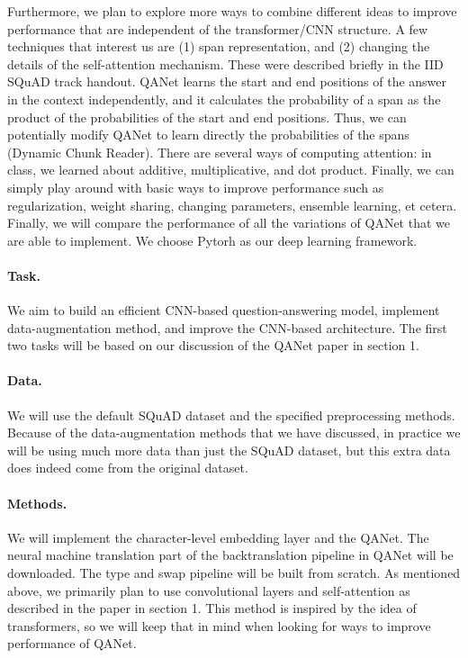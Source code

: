 \documentclass{article}
\begin{document}
Furthermore, we plan to explore more ways to combine different ideas to improve performance that are independent of the transformer/CNN structure. A few techniques that interest us are (1) span representation, and (2) changing the details of the self-attention mechanism. These were described briefly in the IID SQuAD track handout. QANet learns the start and end positions of the answer in the context independently, and it calculates the probability of a span as the product of the probabilities of the start and end positions. Thus, we can potentially modify QANet to learn directly the probabilities of the spans (Dynamic Chunk Reader). There are several ways of computing attention: in class, we learned about additive, multiplicative, and dot product. Finally, we can simply play around with basic ways to improve performance such as regularization, weight sharing, changing parameters, ensemble learning, et cetera. Finally, we will compare the performance of all the variations of QANet that we are able to implement. We choose Pytorh as our deep learning framework. 
\paragraph{Task.} 
We aim to build an efficient CNN-based question-answering model, implement data-augmentation method, and improve the CNN-based architecture. The first two tasks will be based on our discussion of the QANet paper in section 1.

\paragraph{Data.}
We will use the default SQuAD dataset and the specified preprocessing methods. Because of the data-augmentation methods that we have discussed, in practice we will be using much more data than just the SQuAD dataset, but this extra data does indeed come from the original dataset.

\paragraph{Methods.}
We will implement the character-level embedding layer and the QANet. The neural machine translation part of the backtranslation pipeline in QANet will be downloaded. The type and swap pipeline will be built from scratch. As mentioned above, we primarily plan to use convolutional layers and self-attention as described in the paper in section 1. This method is inspired by the idea of transformers, so we will keep that in mind when looking for ways to improve performance of QANet.
\end{document}
